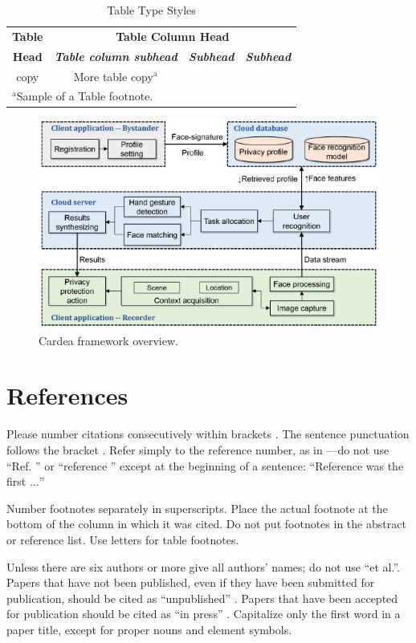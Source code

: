 \documentclass[conference]{IEEEtran}
\begin{document}
\begin{table}[htbp]
\caption{Table Type Styles}
\begin{center}
\begin{tabular}{|c|c|c|c|}
\hline
\textbf{Table}&\multicolumn{3}{|c|}{\textbf{Table Column Head}} \\
\cline{2-4} 
\textbf{Head} & \textbf{\textit{Table column subhead}}& \textbf{\textit{Subhead}}& \textbf{\textit{Subhead}} \\
\hline
copy& More table copy$^{\mathrm{a}}$& &  \\
\hline
\multicolumn{4}{l}{$^{\mathrm{a}}$Sample of a Table footnote.}
\end{tabular}
\label{tab1}
\end{center}
\end{table}

\begin{figure}[t]
\centerline{\includegraphics[width=.5\textwidth]{img/cardea_overview_diagram.png}}
\caption{Cardea framework overview.}
\label{fig}
\end{figure}


\section*{References}

Please number citations consecutively within brackets \cite{shu2016cardea}. The 
sentence punctuation follows the bracket \cite{dufaux2010framework}. Refer simply to the reference 
number, as in \cite{denning2014situ}---do not use ``Ref. \cite{denning2014situ}'' or ``reference \cite{denning2014situ}'' except at 
the beginning of a sentence: ``Reference \cite{lu2017privacy} was the first $\ldots$''

Number footnotes separately in superscripts.\cite{chinomi2008PriSurv} Place the actual footnote at 
the bottom of the column in which it was cited. Do not put footnotes in the 
abstract or reference list. Use letters for table footnotes.

Unless there are six authors or more give all authors' names; do not use 
``et al.''. Papers that have not been published, even if they have been 
submitted for publication, should be cited as ``unpublished'' \cite{lu2017privacy}. Papers 
that have been accepted for publication should be cited as ``in press'' \cite{olteanu2018consensual}. 
Capitalize only the first word in a paper title, except for proper nouns and 
element symbols.\cite{sen2016ipic}
\end{document}
